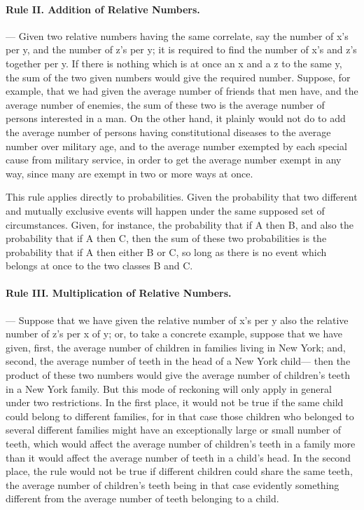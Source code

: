 \paragraph{Rule II. Addition of Relative Numbers.} --- Given two relative numbers having the same correlate, say the number of x's per y, and the number of z's per y; it is required to find the number of x's and z's together per y. If there is nothing which is at once an x and a z to the same y, the sum of the two given numbers would give the required number. Suppose, for example, that we had given the average number of friends that men have, and the average number of enemies, the sum of these two is the average number of persons interested in a man. On the other hand, it plainly would not do to add the average number of persons having constitutional diseases to the average number over military age, and to the average number exempted by each special cause from military service, in order to get the average number exempt in any way, since many are exempt in two or more ways at once.

This rule applies directly to probabilities. Given the probability that two different and mutually exclusive events will happen under the same supposed set of circumstances. Given, for instance, the probability that if A then B, and also the probability that if A then C, then the sum of these two probabilities is the probability that if A then either B or C, so long as there is no event which belongs at once to the two classes B and C.

\paragraph{Rule III. Multiplication of Relative Numbers.} --- Suppose that we have given the relative number of x's per y also the relative number of z's per x of y; or, to take a concrete example, suppose that we have given, first, the average number of children in families living in New York; and, second, the average number of teeth in the head of a New York child--- then the product of these two numbers would give the average number of children's teeth in a New York family. But this mode of reckoning will only apply in general under two restrictions. In the first place, it would not be true if the same child could belong to different families, for in that case those children who belonged to several different families might have an exceptionally large or small number of teeth, which would affect the average number of children's teeth in a family more than it would affect the average number of teeth in a child's head. In the second place, the rule would not be true if different children could share the same teeth, the average number of children's teeth being in that case evidently something different from the average number of teeth belonging to a child.

